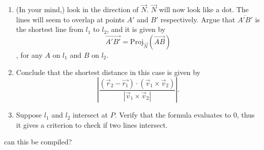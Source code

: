 \begin{exerciselist}
\begin{enumerate}[label=(\alph*)]
		\item (In your mind,) look in the direction of $\vec{N}$. $\vec{N}$ will now look like a dot. The lines will seem to overlap at points $A'$ and $B'$ respectively. Argue that $\overline{A'B'}$ is the shortest line from $l_1$ to $l_2$, and it is given by \[
			\overrightarrow{A'B'}=\textrm{Proj}_{\vec{N}}(\overrightarrow{AB})
		\], for any $A$ on $l_1$ and $B$ on $l_2$.
		\item Conclude that the shortest distance in this case is given by \[
			\left|\frac{(\vec{r}_2-\vec{r_1}) \cdot(\vec{v}_1\times\vec{v}_2)}{|\vec{v}_1\times\vec{v}_2|}\right|.
		\]
		\item Suppose $l_1$ and $l_2$ intersect at $P$. Verify that the formula evaluates to $0$, thus it gives a criterion to check if two lines intersect.
	\end{enumerate}
\end{exerciselist}
	
can this be compiled?
